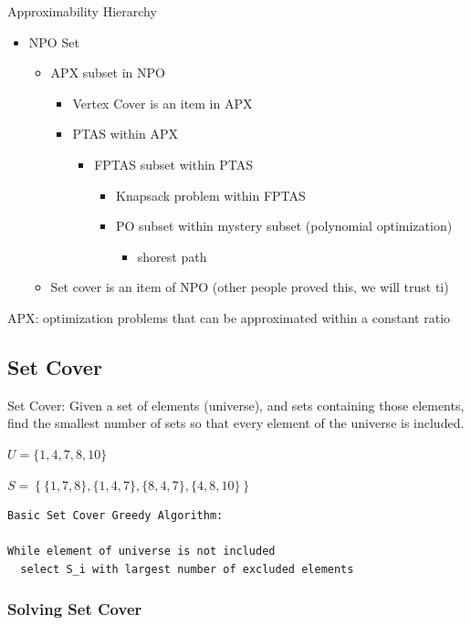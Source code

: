 \documentclass[11pt]{article}
\begin{document}
Approximability Hierarchy
\begin{itemize}
\item NPO Set
\begin{itemize}
\item APX subset in NPO
\begin{itemize}
\item Vertex Cover is an item in APX
\item PTAS within APX
\begin{itemize}
\item FPTAS subset within PTAS
\begin{itemize}
\item Knapsack problem within FPTAS
\item PO subset within mystery subset (polynomial optimization)
\begin{itemize}
\item shorest path
\end{itemize}
\end{itemize}
\end{itemize}
\end{itemize}
\item Set cover is an item of NPO (other people proved this, we will trust ti)
\end{itemize}
\end{itemize}

APX: optimization problems that can be approximated within a constant ratio
\subsection{Set Cover}
\label{sec:orgf5aef67}

Set Cover: Given a set of elements (universe), and sets containing those elements, find the smallest number of sets so that every element of the universe is included.

\(U  = \{1,4,7,8,10\}\)

\(S  = \left\{ \{1,7,8\}, \{1,4,7\}, \{8,4,7\} , \{4, 8, 10\}\right\}\)



\begin{verbatim}
Basic Set Cover Greedy Algorithm:

While element of universe is not included
  select S_i with largest number of excluded elements
\end{verbatim}

\subsubsection{Solving Set Cover}
\label{sec:org58227d1}
\end{document}
